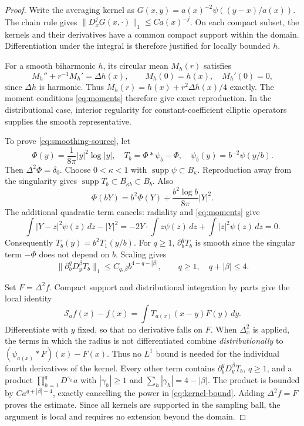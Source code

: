 \documentclass[11pt,twoside,leqno]{article}
\numberwithin{equation}{section}
\theoremstyle{definition}
\theoremstyle{remark}
\newcommand{\supp}{\operatorname{supp}}
\begin{document}
\begin{proof}
Write the averaging kernel as
$G(x,y)=a(x)^{-2}\psi((y-x)/a(x))$.
The chain rule gives $\|D_x^jG(x,\cdot)\|_1\le Ca(x)^{-j}$.
On each compact subset, the kernels and their derivatives have a common
compact support within the domain. Differentiation under the integral
is therefore justified for locally bounded $h$.

For a smooth biharmonic $h$, its circular mean $M_h(r)$ satisfies
\[
 M_h''+r^{-1}M_h'=\Delta h(x),\qquad
 M_h(0)=h(x),\quad M_h'(0)=0,
\]
since $\Delta h$ is harmonic. Thus
$M_h(r)=h(x)+r^2\Delta h(x)/4$ exactly. The moment conditions \eqref{eq:moments} therefore give exact
reproduction. In the distributional case, interior regularity for
constant-coefficient elliptic operators supplies the smooth
representative.

To prove \eqref{eq:smoothing-source}, let
\[
 \Phi(y)=\frac1{8\pi}|y|^2\log|y|,\quad
 T_b=\Phi*\psi_b-\Phi,\quad \psi_b(y)=b^{-2}\psi(y/b).
\]
Then $\Delta^2\Phi=\delta_0$. Choose $0<\kappa<1$ with
$\supp\psi\subset B_\kappa$. Reproduction away from the singularity
gives $\supp T_b\subset\overline{B_{\kappa b}}\subset B_b$. Also
\[
 \Phi(bY)=b^2\Phi(Y)+\frac{b^2\log b}{8\pi}|Y|^2.
\]
The additional quadratic term cancels: radiality and
\eqref{eq:moments} give
\[
 \int|Y-z|^2\psi(z)\,dz-|Y|^2
 =-2Y\cdot\int z\psi(z)\,dz+\int|z|^2\psi(z)\,dz=0.
\]
Consequently $T_b(y)=b^2T_1(y/b)$. For $q\ge1$,
$\partial_b^qT_b$ is smooth since the singular term $-\Phi$ does
not depend on $b$. Scaling gives
\begin{equation}\label{eq:kernel-bound}
 \|\partial_b^qD_y^\beta T_b\|_1
 \le C_{q,\beta}b^{4-q-|\beta|},\qquad
 q\ge1,\quad q+|\beta|\le4.
\end{equation}

Set $F=\Delta^2f$. Compact support and distributional integration by
parts give the local identity
\[
 \mathcal S_af(x)-f(x)=\int T_{a(x)}(x-y)F(y)\,dy.
\]
Differentiate with $y$ fixed, so that no derivative falls on $F$.
When $\Delta_x^2$ is applied, the terms in which the radius is not
differentiated combine \emph{distributionally} to
$(\psi_{a(x)}*F)(x)-F(x)$. Thus no $L^1$ bound is needed for the
individual fourth derivatives of the kernel.
Every other term contains
$\partial_b^qD_y^\beta T_b$, $q\ge1$, and a product
$\prod_{h=1}^qD^{\gamma_h}a$ with
$|\gamma_h|\ge1$ and $\sum_h|\gamma_h|=4-|\beta|$.
The product is bounded by $Ca^{q+|\beta|-4}$, exactly cancelling
the power in \eqref{eq:kernel-bound}. Adding $\Delta^2f=F$ proves
the estimate. Since all kernels are supported in the sampling ball,
the argument is local and requires no extension beyond the domain.
\end{proof}
\end{document}
